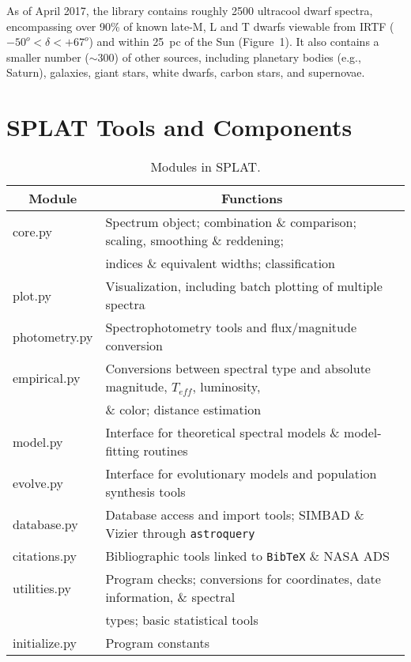 \documentclass[usenatbib]{basi}
\begin{document}
As of April 2017, the library contains roughly 2500 ultracool dwarf spectra, encompassing over 90\% of known late-M, L and T  dwarfs viewable from IRTF ($-50^o < \delta < +67^o$) and within 25~pc of the Sun (Figure~1). It also contains a smaller number ($\sim$300) of other sources, including planetary bodies (e.g., Saturn), galaxies, giant stars, white dwarfs, carbon stars, and supernovae.

        
\section{SPLAT Tools and Components}\label{s:tools}

\begin{table}[t]
  \caption{Modules in SPLAT.}\label{tab:module}
  \medskip
  \begin{center}
    \begin{tabular}{ll}
    \hline
    \multicolumn{1}{c}{Module}
                 & \multicolumn{1}{c}{Functions} \\
     \hline
core.py & Spectrum object; combination \& comparison; scaling, smoothing \& reddening; \\
 & indices \& equivalent widths; classification \\
plot.py & Visualization, including batch plotting of multiple spectra \\
photometry.py & Spectrophotometry tools and flux/magnitude conversion \\
empirical.py & Conversions between spectral type and absolute magnitude, $T_{eff}$, luminosity, \\
 & \& color; distance estimation \\
model.py & Interface for theoretical spectral models \& model-fitting routines \\
evolve.py & Interface for evolutionary models and population synthesis tools \\
database.py & Database access and import tools; SIMBAD \& Vizier through \texttt{astroquery} \\
citations.py & Bibliographic tools linked to \texttt{BibTeX} \& NASA ADS \\
utilities.py & Program checks; conversions for coordinates, date information, \& spectral  \\
 & types; basic statistical tools \\
initialize.py & Program constants \\
    \hline
    \end{tabular}\\[5pt]
  \end{center}
\end{table}
\end{document}
